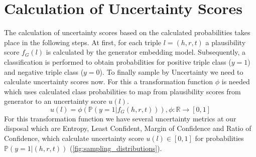 \section{Calculation of Uncertainty Scores}
\label{sec:calculation_of_uncertainty_scores}


The calculation of uncertainty scores based on the calculated probabilities takes place in the following steps.
At first, for each triple $l= (h, r, t)$ a plausibility score $f_G(l)$ is calculated by the generator embedding model. 
Subsequently, a classification is performed to obtain probabilities for positive triple class ($y = 1$) and negative triple class ($y = 0$).
To finally sample by Uncertainty we need to calculate uncertainty scores now. 
For this a transformation function $\phi$ is needed which uses calculated class probabilities to map from plausibility scores from generator to an uncertainty score $u(l)$.
\begin{equation} \label{eqn:uncertainty_function}
    u(l) = \phi(\mathds{P}(y = 1| f_G(h, r, t))), \phi: \mathbb{R} \rightarrow [0,1]
\end{equation}
For this transformation function we have several uncertainty metrics at our disposal which are Entropy, Least Confident, Margin of Confidence and Ratio of Confidence, which calculate uncertainty score $u(l) \in [0, 1]$ for probabilities $\mathbb{P}(y = 1 | (h,r,t))$ (\autoref{fig:sampling_distributions}).
